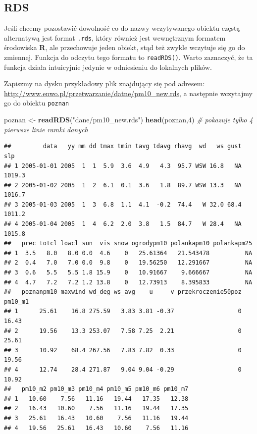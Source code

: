 \documentclass[]{book}
\newenvironment{Shaded}{\begin{snugshade}}{\end{snugshade}}
\newcommand{\KeywordTok}[1]{\textcolor[rgb]{0.13,0.29,0.53}{\textbf{#1}}}
\newcommand{\DecValTok}[1]{\textcolor[rgb]{0.00,0.00,0.81}{#1}}
\newcommand{\StringTok}[1]{\textcolor[rgb]{0.31,0.60,0.02}{#1}}
\newcommand{\CommentTok}[1]{\textcolor[rgb]{0.56,0.35,0.01}{\textit{#1}}}
\newcommand{\NormalTok}[1]{#1}
\theoremstyle{definition}
\theoremstyle{definition}
\theoremstyle{definition}
\theoremstyle{remark}
\begin{document}
\subsection{RDS}\label{rds}

Jeśli chcemy pozostawić dowolność co do nazwy wczytywanego obiektu
częstą alternatywą jest format \texttt{.rds}, który również jest
wewnętrznym formatem środowiska \textbf{R}, ale przechowuje jeden
obiekt, stąd też zwykle wczytuje się go do zmiennej. Funkcja do odczytu
tego formatu to \texttt{readRDS()}. Warto zaznaczyć, że ta funkcja
działa intuicyjnie jedynie w odniesieniu do lokalnych plików.

Zapiszmy na dysku przykładowy plik znajdujący się pod adresem:
\href{http://www.enwo.pl/przetwarzanie/dane/pm10_new.rds}{http://www.enwo.pl/przetwarzanie/datne/pm10\_new.rds},
a następnie wczytajmy go do obiektu \texttt{poznan}

\begin{Shaded}
\begin{Highlighting}[]
\NormalTok{poznan <-}\StringTok{ }\KeywordTok{readRDS}\NormalTok{(}\StringTok{"dane/pm10_new.rds"}\NormalTok{)}
\KeywordTok{head}\NormalTok{(poznan,}\DecValTok{4}\NormalTok{) }\CommentTok{# pokazuje tylko 4 pierwsze linie ramki danych}
\end{Highlighting}
\end{Shaded}

\begin{verbatim}
##         data   yy mm dd tmax tmin tavg tdavg rhavg  wd   ws gust    slp
## 1 2005-01-01 2005  1  1  5.9  3.6  4.9   4.3  95.7 WSW 16.8   NA 1019.3
## 2 2005-01-02 2005  1  2  6.1  0.1  3.6   1.8  89.7 WSW 13.3   NA 1016.7
## 3 2005-01-03 2005  1  3  6.8  1.1  4.1  -0.2  74.4   W 32.0 68.4 1011.2
## 4 2005-01-04 2005  1  4  6.2  2.0  3.8   1.5  84.7   W 28.4   NA 1015.8
##   prec totcl lowcl sun  vis snow ogrodypm10 polankapm10 polankapm25
## 1  3.5   8.0   8.0 0.0  4.6    0   25.61364   21.543478          NA
## 2  0.4   7.0   7.0 0.0  9.8    0   19.56250   12.291667          NA
## 3  0.6   5.5   5.5 1.8 15.9    0   10.91667    9.666667          NA
## 4  4.7   7.2   7.2 1.2 13.8    0   12.73913    8.395833          NA
##   poznanpm10 maxwind wd_deg ws_avg    u     v przekroczenie50poz pm10_m1
## 1      25.61    16.8 275.59   3.83 3.81 -0.37                  0   16.43
## 2      19.56    13.3 253.07   7.58 7.25  2.21                  0   25.61
## 3      10.92    68.4 267.56   7.83 7.82  0.33                  0   19.56
## 4      12.74    28.4 271.87   9.04 9.04 -0.29                  0   10.92
##   pm10_m2 pm10_m3 pm10_m4 pm10_m5 pm10_m6 pm10_m7
## 1   10.60    7.56   11.16   19.44   17.35   12.38
## 2   16.43   10.60    7.56   11.16   19.44   17.35
## 3   25.61   16.43   10.60    7.56   11.16   19.44
## 4   19.56   25.61   16.43   10.60    7.56   11.16
\end{verbatim}
\end{document}
